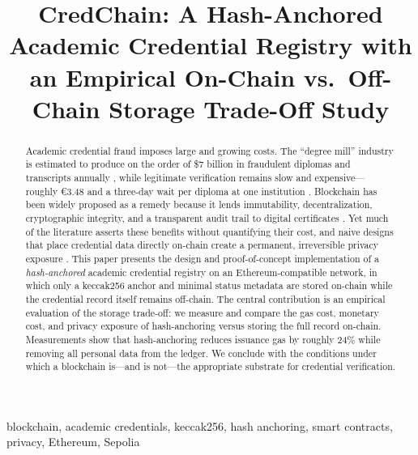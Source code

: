 \documentclass[conference]{IEEEtran}
\begin{document}
\title{CredChain: A Hash-Anchored Academic Credential Registry with an Empirical On-Chain vs.\ Off-Chain Storage Trade-Off Study}

\author{
}

\maketitle

\begin{abstract}
Academic credential fraud imposes large and growing costs. The ``degree mill'' industry is estimated to produce on the order of \$7 billion in fraudulent diplomas and transcripts annually \cite{slr_certificate}, while legitimate verification remains slow and expensive---roughly \euro3.48 and a three-day wait per diploma at one institution \cite{capece_trust}. Blockchain has been widely proposed as a remedy because it lends immutability, decentralization, cryptographic integrity, and a transparent audit trail to digital certificates \cite{cheng_smartcontract,capece_trust}. Yet much of the literature asserts these benefits without quantifying their cost, and naive designs that place credential data directly on-chain create a permanent, irreversible privacy exposure \cite{slr_certificate}. This paper presents the design and proof-of-concept implementation of a \emph{hash-anchored} academic credential registry on an Ethereum-compatible network, in which only a keccak256 anchor and minimal status metadata are stored on-chain while the credential record itself remains off-chain. The central contribution is an empirical evaluation of the storage trade-off: we measure and compare the gas cost, monetary cost, and privacy exposure of hash-anchoring versus storing the full record on-chain. Measurements show that hash-anchoring reduces issuance gas by roughly 24\% while removing all personal data from the ledger. We conclude with the conditions under which a blockchain is---and is not---the appropriate substrate for credential verification.
\end{abstract}

\begin{IEEEkeywords}
blockchain, academic credentials, keccak256, hash anchoring, smart contracts, privacy, Ethereum, Sepolia
\end{IEEEkeywords}
\end{document}
